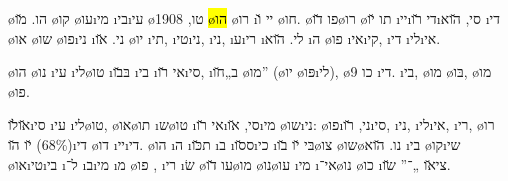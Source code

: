 
%
{\o{הו}. \u{מו} \o{קו} \o{עו}\i{מי} \i{בי}\i{עי} \o{טו},  1908}
\hl{\o{הו}}  \o{רו} \i{יי} \u{ו} \o{חו}. \o{פו} \u{דו}\o{רו} \o{תו} \u{יו} \i{יי}\i{די} \u{רו}\i{סי},  \u{הוא} \i{די} \o{או} \o{שו}  \o{פו}\i{ני} \i{ני}. \u{או} \o{יו}  \i{תי}, \i{טי}\i{ני}, \i{ני}, \i{ע}\i{רי} \i{לי}. \u{הוא}  \i{ה} \o{פו} \i{אי}\i{קי}, \i{די} \i{לי}\i{אי}.

\o{הו} \o{נו} \i{עי} \i{לי}\o{טו} \i{בּ}\u{בו} \i{בי}  \i{אי} \u{רו}\i{סי}, \i{ב}„\u{חו} \o{מו}” (\o{יו} \o{פּו}\i{לי}), \o{כו}  9 \i{די}. \i{בי}, \o{מו}  \o{בּו},  \o{מו} \o{פו}.

\u{או}\u{לו}\i{סי} \i{עי} \i{לי}\o{טו},  \o{או}\o{תו}   \i{ש}\o{טו} \i{אי} \u{רו}\i{סי},   \u{או}\i{מי} \o{שו}\i{ני}: \o{פו}\i{ני}, \u{רו}\i{סי}, \i{ני}, \i{לי}\i{אי}, \i{רי},  \o{רו} (68\%) \u{יו} \u{הו}\i{די} \o{דו} \i{יי}\i{די}. \o{הו} \i{ה} \i{ת}\u{כּו} \i{ב} \i{ס}\u{סו}\i{כי} \i{בּי} \u{יו}  \u{בו}\o{צו} \o{שו}\o{נו}. \u{הוא} \i{בי}  \o{קו}\i{שי} \o{או}\i{טי}\i{בי}  \i{ל}־ \i{ב}\i{מי} \i{מ} \o{פו}  , \i{רי} \i{שׂ} \o{עו} \u{דו}\o{מו} \o{נו}\o{עו} \i{מי}  \i{אי}־\o{נו}  \o{כו} \i{צי}\u{או}   „־” \u{שו}.

